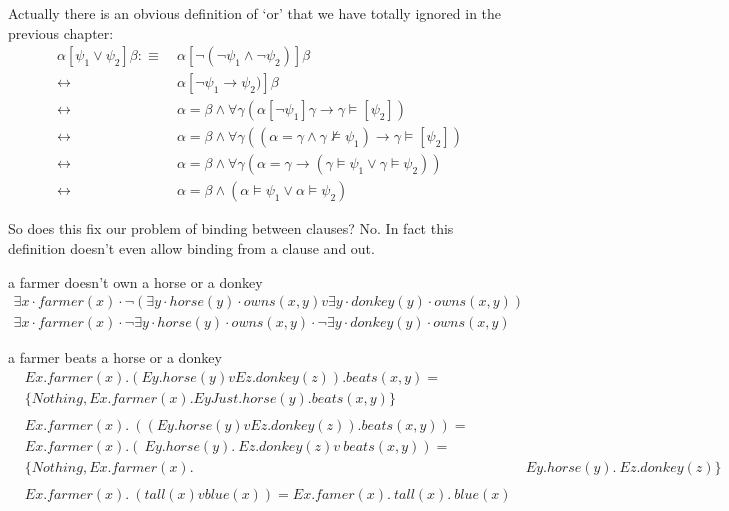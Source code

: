 \documentclass[12pt]{article}
\begin{document}
Actually there is an obvious definition of `or' that we have totally ignored in the previous chapter:
\begin{align}
\alpha[\psi_1\vee\psi_2]\beta
 :\equiv&\ \alpha[\neg(\neg\psi_1\wedge\neg\psi_2)]\beta \nonumber\\
 \leftrightarrow&\ \alpha[\neg\psi_1\rightarrow\psi_2)]\beta \nonumber\\
 \leftrightarrow&\ \alpha = \beta \wedge \forall\gamma(\alpha[\neg\psi_1]\gamma\rightarrow\gamma\models[\psi_2]) \nonumber\\
 \leftrightarrow&\ \alpha = \beta \wedge \forall\gamma((\alpha=\gamma\wedge\gamma\not\models\psi_1)\rightarrow\gamma\models[\psi_2]) \nonumber\\
 \leftrightarrow&\ \alpha = \beta \wedge \forall\gamma(\alpha=\gamma\rightarrow(\gamma\models\psi_1\vee\gamma\models\psi_2)) \nonumber\\
 \leftrightarrow&\ \alpha = \beta \wedge (\alpha\models\psi_1\vee\alpha\models\psi_2) \label{sem_or}
\end{align}

So does this fix our problem of binding between clauses? No. In fact this definition doesn't even allow binding from a clause and out.

a farmer doesn't own a horse or a donkey
\begin{align}
\exists x\cdot farmer(x) \cdot \neg(\exists y\cdot horse(y)\cdot owns(x,y) v \exists y\cdot donkey(y)\cdot owns(x,y))\nonumber\\
\exists x\cdot farmer(x) \cdot \neg\exists y\cdot horse(y)\cdot owns(x,y) \cdot \neg \exists y\cdot donkey(y)\cdot owns(x,y)\nonumber
\end{align}

a farmer beats a horse or a donkey
\begin{align}
&Ex.farmer(x).(Ey.horse(y) v Ez.donkey(z)).beats(x,y) = \\
&\{Nothing, Ex.farmer(x).EyJust .horse(y).beats(x,y)\}\\
\\
&Ex.farmer(x).~((Ey.horse(y) v Ez.donkey(z)).beats(x,y)) = \\
&Ex.farmer(x).(~Ey.horse(y).~Ez.donkey(z) v ~beats(x,y)) = \\
&\{Nothing, Ex.farmer(x).&~Ey.horse(y).~Ez.donkey(z)\}\\
\\
&Ex.farmer(x).~(tall(x) v blue(x)) = Ex.famer(x).~tall(x).~blue(x)
\end{align}
\end{document}
